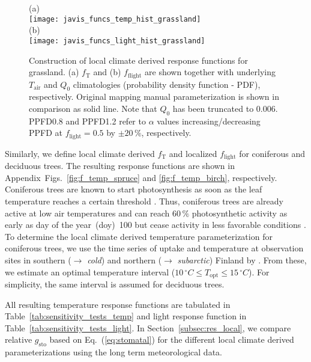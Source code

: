 \documentclass[bg, manuscript]{copernicus}
\begin{document}
\begin{figure}[t]
  \centering
  (a)\\
  \texttt{[image: javis\_funcs\_temp\_hist\_grassland]}\\
  (b)\\
  \texttt{[image: javis\_funcs\_light\_hist\_grassland]}
\caption{Construction of local climate derived response functions for grassland. (a) $f_\mathrm{T}$ and (b) $f_\mathrm{flight}$ are shown together with underlying $T_\mathrm{air}$ and $Q_0$ climatologies (probability density function - PDF), respectively. Original mapping manual parameterization is shown in comparison as solid line. Note that $Q_0$ has been truncated to $0.006$. PPFD0.8 and PPFD1.2 refer to $\alpha$ values increasing/decreasing PPFD at $f_\mathrm{light}=0.5$ by $\pm 20\,\%$, respectively.}
\label{fig:f_temp_grassland}
\end{figure}

Similarly, we define local climate derived $f_\mathrm{T}$ and localized $f_\mathrm{light}$ for coniferous and deciduous trees. The resulting response functions are shown in Appendix~Figs.~\ref{fig:f_temp_spruce} and \ref{fig:f_temp_birch}, respectively.
Coniferous trees are known to start photosynthesis as soon as the leaf temperature reaches a certain threshold \citep{TB:Kolari2007}. Thus, coniferous trees are already active at low air temperatures and can reach $60\,\unit{\%}$ photosynthetic activity as early as day of the year~(\unit{doy})~100 but cease activity in less favorable conditions \citep{TB:Kolari2007, TP:Wallin2013}. 
To determine the local climate derived temperature parameterization for coniferous trees, we use the time series of  uptake and temperature at observation sites in southern ($\rightarrow$ \emph{cold}) and northern ($\rightarrow$ \emph{subarctic}) Finland by \citet{TB:Kolari2007}. From these, we estimate an optimal temperature interval ($10\,\unit{^\circ C}\le T_\mathrm{opt} \le 15\,\unit{^\circ C}$). For simplicity, the same interval is assumed for deciduous trees.

All resulting temperature response functions are tabulated in Table~\ref{tab:sensitivity_tests_temp} and light response function in Table~\ref{tab:sensitivity_tests_light}. In Section~\ref{subsec:res_local}, we compare relative $g_\mathrm{sto}$ based on Eq.~(\ref{eq:stomatal}) for the different local climate derived parameterizations using the long term meteorological data.
\end{document}
